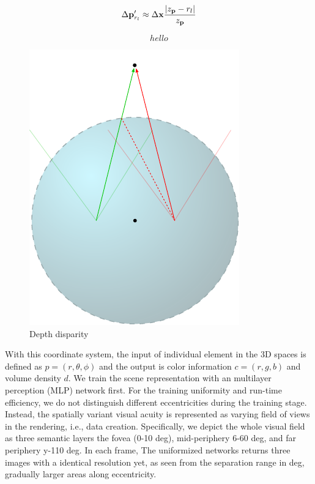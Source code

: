 \begin{equation}
    \Delta\mathbf{p}'_{r_l} \approx \Delta\mathbf{x} \frac{|z_{\mathbf{p}} - r_l|}{z_{\mathbf{p}}}
\end{equation}

\begin{equation}
    hello
\end{equation}

\begin{figure}[htb]
    \centering
    \includegraphics[width=0.96\linewidth]{TOG/figs/depth_disparity.pdf}
    \caption{Depth disparity}
    \label{fig:method:eccentricity}
\end{figure}

With this coordinate system, the input of individual element in the 3D spaces is defined as $p=(r, \theta, \phi)$ and the output is color information $c=(r,g,b)$ and volume density $d$. We train the scene representation with an multilayer perception (MLP) network first. 
For the training uniformity and run-time efficiency, we do not distinguish different eccentricities during the training stage. Instead, the spatially variant visual acuity is represented as varying field of views in the rendering, i.e., data creation.
Specifically, we depict the whole visual field as three semantic layers the fovea ({0-10 deg}), mid-periphery {6-60 deg}, and far periphery {y-110 deg}. In each frame, The uniformized networks returns three images with a identical resolution yet, as seen from the separation range in deg, gradually larger areas along eccentricity.


